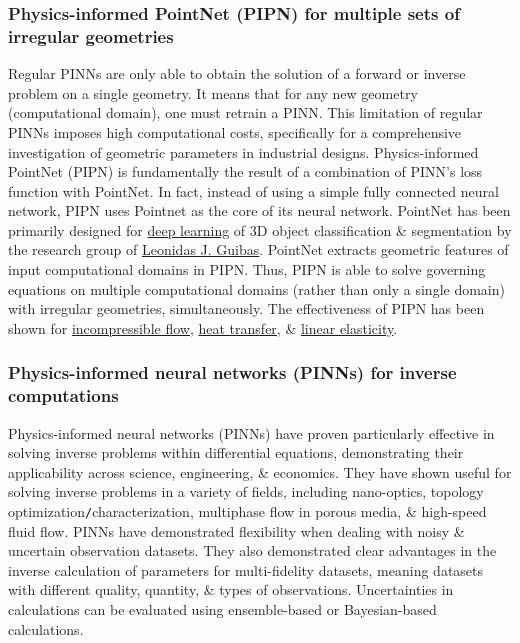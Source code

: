\documentclass{article}
\begin{document}
\subsubsection{Physics-informed PointNet (PIPN) for multiple sets of irregular geometries}
Regular PINNs are only able to obtain the solution of a forward or inverse problem on a single geometry. It means that for any new geometry (computational domain), one must retrain a PINN. This limitation of regular PINNs imposes high computational costs, specifically for a comprehensive investigation of geometric parameters in industrial designs. Physics-informed PointNet (PIPN) is fundamentally the result of a combination of PINN's loss function with PointNet. In fact, instead of using a simple fully connected neural network, PIPN uses Pointnet as the core of its neural network. PointNet has been primarily designed for \href{https://en.wikipedia.org/wiki/Deep_learning}{deep learning} of 3D object classification \& segmentation by the research group of \href{https://en.wikipedia.org/wiki/Leonidas_J._Guibas}{Leonidas J. Guibas}. PointNet extracts geometric features of input computational domains in PIPN. Thus, PIPN is able to solve governing equations on multiple computational domains (rather than only a single domain) with irregular geometries, simultaneously. The effectiveness of PIPN has been shown for \href{https://en.wikipedia.org/wiki/Incompressible_flow}{incompressible flow}, \href{https://en.wikipedia.org/wiki/Heat_transfer}{heat transfer}, \& \href{https://en.wikipedia.org/wiki/Linear_elasticity}{linear elasticity}.

\subsubsection{Physics-informed neural networks (PINNs) for inverse computations}
Physics-informed neural networks (PINNs) have proven particularly effective in solving inverse problems within differential equations, demonstrating their applicability across science, engineering, \& economics. They have shown useful for solving inverse problems in a variety of fields, including nano-optics, topology optimization{\tt/}characterization, multiphase flow in porous media, \& high-speed fluid flow. PINNs have demonstrated flexibility when dealing with noisy \& uncertain observation datasets. They also demonstrated clear advantages in the inverse calculation of parameters for multi-fidelity datasets, meaning datasets with different quality, quantity, \& types of observations. Uncertainties in calculations can be evaluated using ensemble-based or Bayesian-based calculations.
\end{document}
